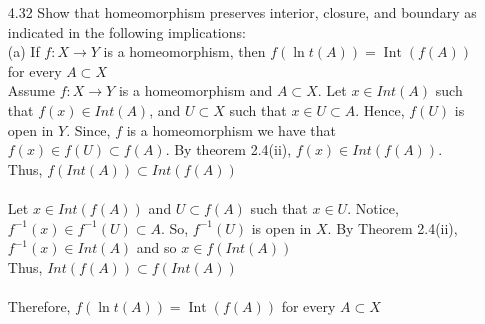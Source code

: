 \documentclass[12pt]{article}
\newcommand{\1}{^{-1}}
\begin{document}
\begin{enumerate}
	\item[4.32] Show that homeomorphism preserves interior, closure, and boundary as indicated in the following implications:\\
	(a) If $f: X \rightarrow Y$ is a homeomorphism, then $f(\ln t(A))=\operatorname{Int}(f(A))$ for every $A \subset X$\\
	Assume $ f:X\to Y $ is a homeomorphism and $ A\subset X $. Let $ x\in Int(A) $ such that $ f(x)\in Int(A) $, and $ U\subset X $ such that $ x\in U \subset A $. Hence, $ f(U) $ is open in $ Y $. Since, $ f $ is a homeomorphism we have that $ f(x)\in f(U)\subset f(A) $. By theorem 2.4(ii), $ f(x)\in Int(f(A)) $.\\
	Thus, $ f(Int(A))\subset Int(f(A)) $\\
	\\
	Let $ x\in Int(f(A)) $ and $ U\subset f(A) $ such that $ x\in U$. Notice, $ f\1(x)\in f\1(U)\subset A $. So, $ f\1(U) $ is open in $ X $. By Theorem 2.4(ii), $ f\1(x)\in Int(A) $ and so $ x\in f(Int(A)) $\\
	Thus, $ Int(f(A))\subset f(Int(A)) $\\
	\\
	Therefore, $f(\ln t(A))=\operatorname{Int}(f(A))$ for every $A \subset X$
	 

\end{enumerate}
\end{document}
